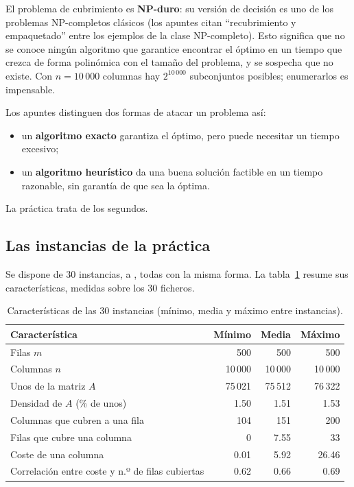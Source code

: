 El problema de cubrimiento es \textbf{NP-duro}: su versión de decisión es uno de los
problemas NP-completos clásicos (los apuntes citan ``recubrimiento y empaquetado'' entre los
ejemplos de la clase NP-completo). Esto significa que no se conoce ningún algoritmo que
garantice encontrar el óptimo en un tiempo que crezca de forma polinómica con el tamaño del
problema, y se sospecha que no existe. Con $n=10\,000$ columnas hay $2^{10\,000}$
subconjuntos posibles; enumerarlos es impensable.

Los apuntes distinguen dos formas de atacar un problema así:
\begin{itemize}
  \item un \textbf{algoritmo exacto} garantiza el óptimo, pero puede necesitar un tiempo
        excesivo;
  \item un \textbf{algoritmo heurístico} da una buena solución factible en un tiempo
        razonable, sin garantía de que sea la óptima.
\end{itemize}
La práctica trata de los segundos.

\subsection{Las instancias de la práctica}\label{sec:instancias}

Se dispone de 30 instancias,  a , todas con la misma forma. La
tabla~\ref{tab:instancias} resume sus características, medidas sobre los 30 ficheros.

\begin{table}[H]
\centering
\caption{Características de las 30 instancias (mínimo, media y máximo entre instancias).}
\label{tab:instancias}
\begin{tabular}{@{}lrrr@{}}
\toprule
Característica & Mínimo & Media & Máximo \\ \midrule
Filas $m$ & 500 & 500 & 500 \\
Columnas $n$ & 10\,000 & 10\,000 & 10\,000 \\
Unos de la matriz $A$ & 75\,021 & 75\,512 & 76\,322 \\
Densidad de $A$ (\% de unos) & 1.50 & 1.51 & 1.53 \\
Columnas que cubren a una fila & 104 & 151 & 200 \\
Filas que cubre una columna & 0 & 7.55 & 33 \\
Coste de una columna & 0.01 & 5.92 & 26.46 \\
Correlación entre coste y n.º de filas cubiertas & 0.62 & 0.66 & 0.69 \\
\bottomrule
\end{tabular}
\end{table}

